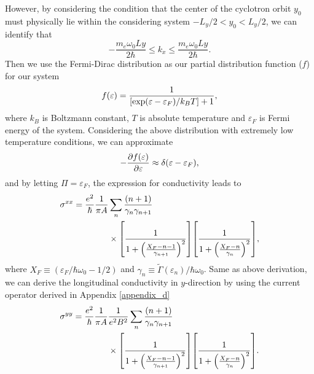 However, by considering the condition that the center of the cyclotron orbit $y_0$ must physically lie within the considering system $-L_y/2 < y_0 < L_y/2$, we can identify that
\begin{equation} \label{eq_30}
 -\frac{m_e\omega_0 Ly}{2\hbar} \leq k_x \leq \frac{m_e\omega_0 Ly}{2\hbar}.
\end{equation}
Then we use the Fermi-Dirac distribution as our partial distribution function ($f$) for our system
\begin{equation} \label{eq_31}
  f(\varepsilon) = \frac{1}{\qty[\exp(\varepsilon - \varepsilon_F)/k_B T]+1},
\end{equation}
where $k_B$ is Boltzmann constant, $T$ is absolute temperature and $\varepsilon_F$ is Fermi energy of the system. Considering the above distribution with extremely low temperature conditions, we can approximate
\begin{equation} \label{eq_32}
  - \pdv{f(\varepsilon)}{\varepsilon} \approx \delta(\varepsilon - \varepsilon_F),
\end{equation}
and by letting $\Pi = \varepsilon_F$, the expression for conductivity leads to
\begin{equation} \label{eq_33}
  \begin{aligned}
    {\sigma}^{xx}  =
    \frac{e^2}{\hbar}
    \frac{1}{\pi A} &
    \sum_{n}
    \frac{\qty(n+1)}{\gamma_{n}\gamma_{n+1}} \\
    &\times
    \qty[
      \frac{1}
      {
        1 + \qty(\frac{X_F - n -1}{\gamma_{n+1}})^2
      }
    ]
    \qty[
      \frac{1}
      {
        1 + \qty(\frac{X_F - n}{\gamma_{n}})^2
      }
    ],
  \end{aligned}
\end{equation}
where $X_F \equiv ({\varepsilon_F}/{\hbar \omega_0} - {1}/{2})$
and
$\gamma_n \equiv {\tilde{{\Gamma}}(\varepsilon_n)}/{\hbar \omega_0}$.
Same as above derivation, we can derive the longitudinal conductivity in $y$-direction by using the current operator derived in Appendix \ref{appendix_d}
\begin{equation} \label{eq_34}
  \begin{aligned}
    {\sigma}^{yy} =
    \frac{e^2}{\hbar}
    \frac{1}{\pi A}&
    \frac{1}{e^2B^2}
    \sum_{n}
    \frac{\qty(n+1)}{\gamma_{n}\gamma_{n+1}} \\
    & \times
    \qty[
      \frac{1}
      {
        1 + \qty(\frac{X_F - n -1}{\gamma_{n+1}})^2
      }
    ]
    \qty[
      \frac{1}
      {
        1 + \qty(\frac{X_F - n}{\gamma_{n}})^2
      }
    ].
  \end{aligned}
\end{equation}

